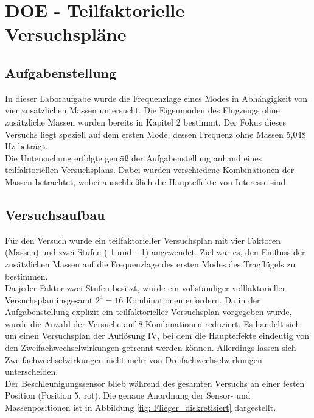 \chapter{DOE - Teilfaktorielle Versuchspläne}
\label{sec: Hauptkapitel 1}

\section{Aufgabenstellung}
    In dieser Laboraufgabe wurde die Frequenzlage eines Modes in Abhängigkeit von vier 
    zusätzlichen Massen untersucht. Die Eigenmoden des Flugzeugs ohne zusätzliche Massen 
    wurden bereits in Kapitel 2 bestimmt. Der Fokus dieses Versuchs liegt speziell auf dem 
    ersten Mode, dessen Frequenz ohne Massen 5,048 Hz beträgt.  
    \\

    \noindent
    Die Untersuchung erfolgte gemäß der Aufgabenstellung anhand eines teilfaktoriellen 
    Versuchsplans. Dabei wurden verschiedene Kombinationen der Massen betrachtet, wobei 
    ausschließlich die Haupteffekte von Interesse sind.


\section{Versuchsaufbau}
    Für den Versuch wurde ein teilfaktorieller Versuchsplan mit vier Faktoren (Massen) 
    und zwei Stufen (-1 und +1) angewendet. Ziel war es, den Einfluss der zusätzlichen Massen 
    auf die Frequenzlage des ersten Modes des Tragflügels zu bestimmen.  
    \\

    \noindent
    Da jeder Faktor zwei Stufen besitzt, würde ein vollständiger vollfaktorieller Versuchsplan 
    insgesamt \(2^4 = 16\) Kombinationen erfordern. Da in der Aufgabenstellung explizit ein 
    teilfaktorieller Versuchsplan vorgegeben wurde, wurde die Anzahl der Versuche auf 
    8 Kombinationen reduziert. Es handelt sich um einen Versuchsplan der Auflösung IV, 
    bei dem die Haupteffekte eindeutig von den Zweifachwechselwirkungen getrennt werden können. 
    Allerdings lassen sich Zweifachwechselwirkungen nicht mehr von Dreifachwechselwirkungen unterscheiden.
    \\

    \noindent
    Der Beschleunigungssensor blieb während des gesamten Versuchs an einer festen Position 
    (Position 5, rot). Die genaue Anordnung der Sensor- und Massenpositionen ist in 
    Abbildung \ref{fig: Flieger_diskretisiert} dargestellt.

